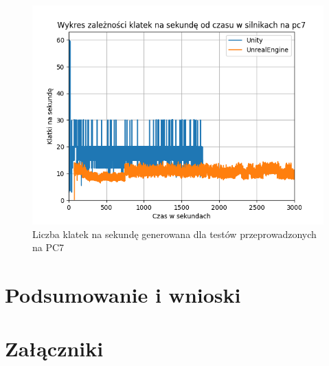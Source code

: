 \documentclass[12pt,twoside]{article}
\begin{document}
\begin{figure}[ht]
    \centering
    \includegraphics[width=16cm]{figures/FPSPlots/pc7searchedDataName.png}
    \caption{Liczba klatek na sekundę generowana dla testów przeprowadzonych na PC7}
    \label{Fig:PC7Tests}
\end{figure}    





\clearpage
\section{Podsumowanie i wnioski}

\clearpage

\section*{Załączniki}



\clearpage

\end{document}
